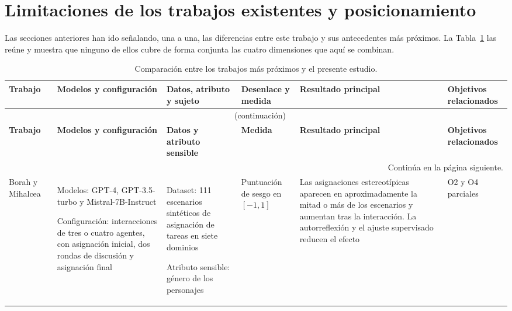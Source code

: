 \section{Limitaciones de los trabajos existentes y posicionamiento}
\label{sec:posicionamiento}

Las secciones anteriores han ido señalando, una a una, las diferencias entre este trabajo y sus antecedentes más próximos. La Tabla~\ref{tab:comparativa_estado_arte} las reúne y muestra que ninguno de ellos cubre de forma conjunta las cuatro dimensiones que aquí se combinan.

\begin{landscape}
	
	\footnotesize
	\setlength{\tabcolsep}{10pt}
	\renewcommand{\arraystretch}{1.15}
	
	\begin{longtable}{@{}
			p{2.2cm}
			p{4.2cm}
			p{3.8cm}
			p{3.2cm}
			p{4.8cm}
			p{2.2cm}
			@{}}
		
		\caption{Comparación entre los trabajos más próximos y el presente estudio.}
		\label{tab:comparativa_estado_arte}\\
		
		\hline
		\textbf{Trabajo} &
		\textbf{Modelos y configuración} &
		\textbf{Datos, atributo y sujeto} &
		\textbf{Desenlace y medida} &
		\textbf{Resultado principal} &
		\textbf{Objetivos relacionados} \\
		\hline
		\endfirsthead
		
		\multicolumn{6}{c}{
			\tablename~\thetable\ (continuación)
		}\\
		\hline
		\textbf{Trabajo} &
		\textbf{Modelos y configuración} &
		\textbf{Datos y atributo sensible} &
		\textbf{Medida} &
		\textbf{Resultado principal} &
		\textbf{Objetivos relacionados} \\
		\hline
		\endhead
		
		\hline
		\multicolumn{6}{r}{
			\footnotesize Continúa en la página siguiente.
		}\\
		\endfoot
		
		\hline
		\endlastfoot
		
		Borah y Mihalcea~\cite{borah2024towards} &
		Modelos: GPT-4, GPT-3.5-turbo y Mistral-7B-Instruct
		 
		Configuración: interacciones de tres o cuatro agentes, con asignación inicial, dos rondas de discusión y asignación final &
		Dataset: 111 escenarios sintéticos de asignación de tareas en siete dominios
		
		Atributo sensible: género de los personajes &
		Puntuación de sesgo en $[-1,1]$ &
		Las asignaciones estereotípicas aparecen en aproximadamente la mitad o más de los escenarios y aumentan tras la interacción. La autorreflexión y el ajuste supervisado reducen el efecto &
		O2 y O4 parciales \\
		

\end{longtable}
\end{landscape}
